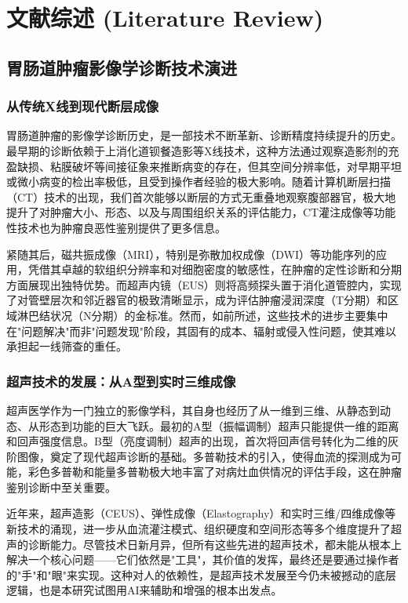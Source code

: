 
\chapter{文献综述 (Literature Review)} \label{chp:literature}

\section{胃肠道肿瘤影像学诊断技术演进}

\subsection{从传统X线到现代断层成像}

胃肠道肿瘤的影像学诊断历史，是一部技术不断革新、诊断精度持续提升的历史。最早期的诊断依赖于上消化道钡餐造影等X线技术，这种方法通过观察造影剂的充盈缺损、粘膜破坏等间接征象来推断病变的存在，但其空间分辨率低，对早期平坦或微小病变的检出率极低，且受到操作者经验的极大影响。随着计算机断层扫描（CT）技术的出现，我们首次能够以断层的方式无重叠地观察腹部器官，极大地提升了对肿瘤大小、形态、以及与周围组织关系的评估能力，CT灌注成像等功能性技术也为肿瘤良恶性鉴别提供了更多信息。

紧随其后，磁共振成像（MRI），特别是弥散加权成像（DWI）等功能序列的应用，凭借其卓越的软组织分辨率和对细胞密度的敏感性，在肿瘤的定性诊断和分期方面展现出独特优势。而超声内镜（EUS）则将高频探头置于消化道管腔内，实现了对管壁层次和邻近器官的极致清晰显示，成为评估肿瘤浸润深度（T分期）和区域淋巴结状况（N分期）的金标准。然而，如前所述，这些技术的进步主要集中在"问题解决"而非"问题发现"阶段，其固有的成本、辐射或侵入性问题，使其难以承担起一线筛查的重任。

\subsection{超声技术的发展：从A型到实时三维成像}

超声医学作为一门独立的影像学科，其自身也经历了从一维到三维、从静态到动态、从形态到功能的巨大飞跃。最初的A型（振幅调制）超声只能提供一维的距离和回声强度信息。B型（亮度调制）超声的出现，首次将回声信号转化为二维的灰阶图像，奠定了现代超声诊断的基础。多普勒技术的引入，使得血流的探测成为可能，彩色多普勒和能量多普勒极大地丰富了对病灶血供情况的评估手段，这在肿瘤鉴别诊断中至关重要。

近年来，超声造影（CEUS）、弹性成像（Elastography）和实时三维/四维成像等新技术的涌现，进一步从血流灌注模式、组织硬度和空间形态等多个维度提升了超声的诊断能力。尽管技术日新月异，但所有这些先进的超声技术，都未能从根本上解决一个核心问题——它们依然是"工具"，其价值的发挥，最终还是要通过操作者的"手"和"眼"来实现。这种对人的依赖性，是超声技术发展至今仍未被撼动的底层逻辑，也是本研究试图用AI来辅助和增强的根本出发点。

